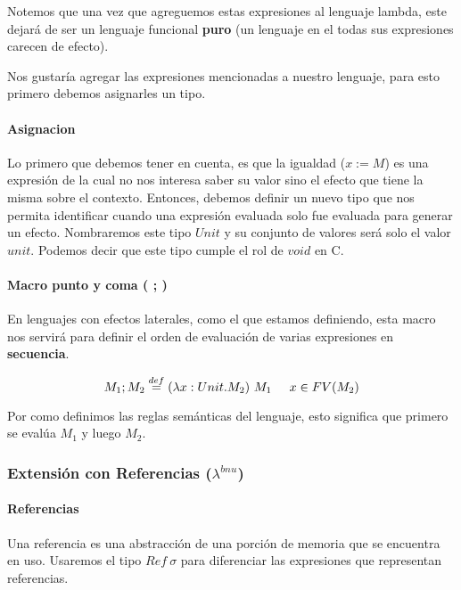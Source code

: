 Notemos que una vez que agreguemos estas expresiones al lenguaje lambda, este dejará de ser un lenguaje funcional \textbf{puro} (un lenguaje en el todas sus expresiones carecen de efecto).

Nos gustaría agregar las expresiones mencionadas a nuestro lenguaje, para esto primero debemos asignarles un tipo. 

\paragraph{Asignacion} Lo primero que debemos tener en cuenta, es que la igualdad ($x := M$) es una expresión de la cual no nos interesa saber su valor sino el efecto que tiene la misma sobre el contexto. Entonces, debemos definir un nuevo tipo que nos permita identificar cuando una expresión evaluada solo fue evaluada para generar un efecto. Nombraremos este tipo $Unit$ y su conjunto de valores será solo el valor $unit$. Podemos decir que este tipo cumple el rol de $void$ en C.

\paragraph{Macro punto y coma ( ; )} En lenguajes con efectos laterales, como el que estamos definiendo, esta macro nos servirá para definir el orden de evaluación de varias expresiones en \textbf{secuencia}.

$$M_1;M_2 \overset{def}{=} (\lambda x: Unit . M_2)~M_1 \hspace*{5mm} x\in FV(M_2)$$

Por como definimos las reglas semánticas del lenguaje, esto significa que primero se evalúa $M_1$ y luego $M_2$. 

\subsubsection{Extensión con Referencias (\texorpdfstring{$\lambda^{bnu}$}{lambda bnu})}



\paragraph{Referencias}
Una referencia es una abstracción de una porción de memoria que se encuentra en uso. Usaremos el tipo $Ref~\sigma$ para diferenciar las expresiones que representan referencias. 


